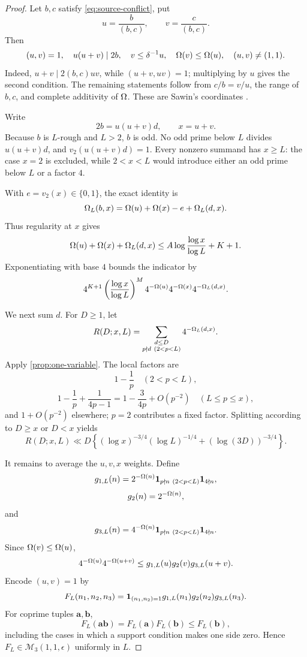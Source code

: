 \documentclass[11pt]{article}
\begin{document}
\begin{proof}
Let \(b,c\) satisfy \eqref{eq:source-conflict}, put
\[
 u=\frac b{(b,c)},\qquad v=\frac c{(b,c)}.
\]
Then
\begin{equation}\label{eq:sawin-coordinates}
 (u,v)=1,\quad u(u+v)\mid2b,\quad
 v\leq\delta^{-1}u,\quad
 \Omega(v)\leq\Omega(u),\quad
 (u,v)\ne(1,1).
\end{equation}
Indeed, \(u+v\mid2(b,c)uv\), while
\((u+v,uv)=1\); multiplying by \(u\) gives the second condition. The
remaining statements follow from \(c/b=v/u\), the range of \(b,c\), and
complete additivity of \(\Omega\). These are Sawin's coordinates
\cite[Lemma~2]{Sawin2026}.

Write
\[
 2b=u(u+v)d,\qquad x=u+v.
\]
Because \(b\) is \(L\)-rough and \(L>2\), \(b\) is odd. No odd prime below
\(L\) divides \(u(u+v)d\), and \(v_2(u(u+v)d)=1\). Every nonzero summand has
\(x\geq L\): the case \(x=2\) is excluded, while \(2<x<L\) would introduce
either an odd prime below \(L\) or a factor \(4\).

With \(e=v_2(x)\in\{0,1\}\), the exact identity is
\[
 \Omega_L(b,x)=
 \Omega(u)+\Omega(x)-e+\Omega_L(d,x).
\]
Thus regularity at \(x\) gives
\[
 \Omega(u)+\Omega(x)+\Omega_L(d,x)
 \leq A\log\frac{\log x}{\log L}+K+1.
\]
Exponentiating with base \(4\) bounds the indicator by
\begin{equation}\label{eq:source-indicator}
 4^{K+1}
 \left(\frac{\log x}{\log L}\right)^M
 4^{-\Omega(u)}4^{-\Omega(x)}4^{-\Omega_L(d,x)}.
\end{equation}

We next sum \(d\). For \(D\geq1\), let
\[
 R(D;x,L)=
 \sum_{\substack{d\leq D\\p\nmid d\ (2<p<L)}}
 4^{-\Omega_L(d,x)}.
\]
Apply \cref{prop:one-variable}. The local factors are
\[
 1-\frac1p\quad(2<p<L),
\]
\[
 1-\frac1p+\frac1{4p-1}
 =1-\frac{3}{4p}+O(p^{-2})
 \quad(L\leq p\leq x),
\]
and \(1+O(p^{-2})\) elsewhere; \(p=2\) contributes a fixed factor. Splitting
according to \(D\geq x\) or \(D<x\) yields
\begin{equation}\label{eq:source-residual}
 R(D;x,L)\ll D\left\{
  (\log x)^{-3/4}(\log L)^{-1/4}
  +(\log(3D))^{-3/4}
 \right\}.
\end{equation}

It remains to average the \(u,v,x\) weights. Define
\[
 g_{1,L}(n)=
 2^{-\Omega(n)}
 \mathbf 1_{p\nmid n\ (2<p<L)}
 \mathbf 1_{4\nmid n},
\]
\[
 g_2(n)=2^{-\Omega(n)},
\]
and
\[
 g_{3,L}(n)=
 4^{-\Omega(n)}
 \mathbf 1_{p\nmid n\ (2<p<L)}
 \mathbf 1_{4\nmid n}.
\]
Since \(\Omega(v)\leq\Omega(u)\),
\[
 4^{-\Omega(u)}4^{-\Omega(u+v)}
 \leq g_{1,L}(u)g_2(v)g_{3,L}(u+v).
\]
Encode \((u,v)=1\) by
\[
 F_L(n_1,n_2,n_3)=
 \mathbf 1_{(n_1,n_2)=1}
 g_{1,L}(n_1)g_2(n_2)g_{3,L}(n_3).
\]
For coprime tuples \(\mathbf a,\mathbf b\),
\[
 F_L(\mathbf a\mathbf b)
 =F_L(\mathbf a)F_L(\mathbf b)\leq F_L(\mathbf b),
\]
including the cases in which a support condition makes one side zero.
Hence \(F_L\in\mathcal M_3(1,1,\epsilon)\) uniformly in \(L\).


\end{proof}
\end{document}

